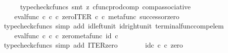 \begin{isabellebody}
\ \ \ \ \isamarkupfalse%
\ {\isacharparenleft}{\kern0pt}typecheck{\isacharunderscore}{\kern0pt}cfuncs{\isacharcomma}{\kern0pt}\ smt\ {\isacharparenleft}{\kern0pt}z{}{\isacharparenright}{\kern0pt}\ cfunc{\isacharunderscore}{\kern0pt}prod{\isacharunderscore}{\kern0pt}comp\ comp{\isacharunderscore}{\kern0pt}associative{}{\isacharparenright}{\kern0pt}\isanewline
\ \ \isamarkupfalse%
\ \isamarkupfalse%
\ {\isachardoublequoteopen}{\isachardot}{\kern0pt}{\isachardot}{\kern0pt}{\isachardot}{\kern0pt}\ {\isacharequal}{\kern0pt}\ \ eval{\isacharunderscore}{\kern0pt}func\ {\isasymnat}\isactrlsub c\ {\isasymnat}\isactrlsub c\ {\isasymcirc}\isactrlsub c\ {\isasymlangle}zero{\isacharcomma}{\kern0pt}ITER\ {\isasymnat}\isactrlsub c\ {\isasymcirc}\isactrlsub c\ {\isasymlangle}metafunc\ successor{\isacharcomma}{\kern0pt}zero{\isasymrangle}{\isasymrangle}{\isachardoublequoteclose}\isanewline
\ \ \ \ \isamarkupfalse%
\ {\isacharparenleft}{\kern0pt}typecheck{\isacharunderscore}{\kern0pt}cfuncs{\isacharcomma}{\kern0pt}\ simp\ add{\isacharcolon}{\kern0pt}\ id{\isacharunderscore}{\kern0pt}left{\isacharunderscore}{\kern0pt}unit{}\ id{\isacharunderscore}{\kern0pt}right{\isacharunderscore}{\kern0pt}unit{}\ terminal{\isacharunderscore}{\kern0pt}func{\isacharunderscore}{\kern0pt}comp{\isacharunderscore}{\kern0pt}elem{\isacharparenright}{\kern0pt}\isanewline
\ \ \isamarkupfalse%
\ \isamarkupfalse%
\ {\isachardoublequoteopen}{\isachardot}{\kern0pt}{\isachardot}{\kern0pt}{\isachardot}{\kern0pt}\ {\isacharequal}{\kern0pt}\ \ eval{\isacharunderscore}{\kern0pt}func\ {\isasymnat}\isactrlsub c\ {\isasymnat}\isactrlsub c\ {\isasymcirc}\isactrlsub c\ {\isasymlangle}zero{\isacharcomma}{\kern0pt}metafunc\ {\isacharparenleft}{\kern0pt}id\ {\isasymnat}\isactrlsub c{\isacharparenright}{\kern0pt}\ {\isasymrangle}{\isachardoublequoteclose}\isanewline
\ \ \ \ \isamarkupfalse%
\ {\isacharparenleft}{\kern0pt}typecheck{\isacharunderscore}{\kern0pt}cfuncs{\isacharcomma}{\kern0pt}\ simp\ add{\isacharcolon}{\kern0pt}\ ITER{\isacharunderscore}{\kern0pt}zero{\isacharprime}{\kern0pt}{\isacharparenright}{\kern0pt}\isanewline
\ \ \isamarkupfalse%
\ \isamarkupfalse%
\ {\isachardoublequoteopen}{\isachardot}{\kern0pt}{\isachardot}{\kern0pt}{\isachardot}{\kern0pt}\ {\isacharequal}{\kern0pt}\ id\isactrlsub c\ {\isasymnat}\isactrlsub c\ {\isasymcirc}\isactrlsub c\ zero{\isachardoublequoteclose}\isanewline
\ \ \ \ \isamarkupfalse%

\end{isabellebody}
